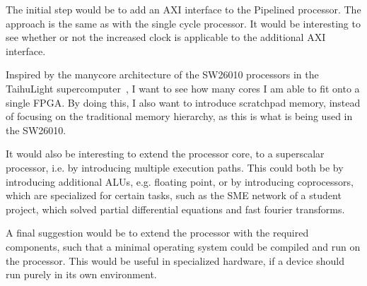 The initial step would be to add an AXI interface to the Pipelined processor.
The approach is the same as with the single cycle processor. It would be
interesting to see whether or not the increased clock is applicable to the
additional AXI interface.

Inspired by the manycore architecture of the SW26010 processors in the
TaihuLight supercomputer~\cite{ref:supercomputer}, I want to see how many
cores I am able to fit onto a single FPGA. By doing this, I also want to
introduce scratchpad memory, instead of focusing on the traditional memory
hierarchy, as this is what is being used in the SW26010.

It would also be interesting to extend the processor core, to a superscalar
processor, i.e. by introducing multiple execution paths. This could both be by
introducing additional ALUs, e.g. floating point, or by introducing
coprocessors, which are specialized for certain tasks, such as the SME network
of a student project, which solved partial differential equations and fast
fourier transforms.

A final suggestion would be to extend the processor with the required
components, such that a minimal operating system could be compiled and run on
the processor. This would be useful in specialized hardware, if a device should
run purely in its own environment.
